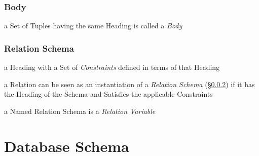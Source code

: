 \subsubsection{Body}\label{sec:body}

a Set of Tuples having the same Heading is called a \emph{Body}



\subsubsection{Relation Schema}\label{sec:relation_schema}

a Heading with a Set of \emph{Constraints} defined in terms of that Heading

a Relation can be seen as an instantiation of a \emph{Relation Schema}
(\S\ref{sec:relation_schema}) if it has the Heading of the Schema and Satisfies
the applicable Constraints

a Named Relation Schema is a \emph{Relation Variable}



\section{Database Schema}\label{sec:database_schema}
